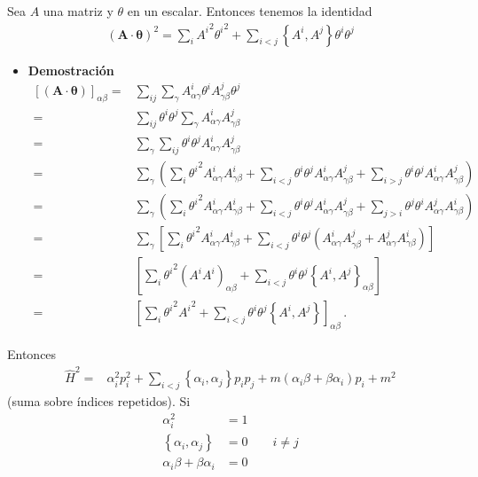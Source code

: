 Sea $A$ una matriz y $\theta$ en un escalar. Entonces tenemos la identidad
\begin{align}
  \label{eq:206qft}
  (\mathbf{A}\cdot\boldsymbol{\theta})^2=\sum_i {A^i}^2 {\theta^i}^2+\sum_{i\lt j}\left\{A^i,A^j  \right\}\theta^i \theta^j 
\end{align}
\begin{itemize}
\item \textbf{Demostración}
  \begin{align}
    \left[\left(\mathbf{A}\cdot\boldsymbol{\theta}\right)\right]_{\alpha\beta}
    =&\sum_{i j}\sum_\gamma A^i_{\alpha\gamma}\theta^iA^j_{\gamma\beta}\theta^j\nonumber\\    
    =&\sum_{i j}\theta^i\theta^j\sum_\gamma A^i_{\alpha\gamma}A^j_{\gamma\beta}\nonumber\\    
    =&\sum_\gamma \sum_{i j}\theta^i\theta^jA^i_{\alpha\gamma}A^j_{\gamma\beta}\nonumber\\    
    =&\sum_\gamma \left(\sum_{i}{\theta^i}^2A^i_{\alpha\gamma}A^i_{\gamma\beta}+\sum_{i<j}\theta^i\theta^jA^i_{\alpha\gamma}A^j_{\gamma\beta}+\sum_{i>j}\theta^i\theta^jA^i_{\alpha\gamma}A^j_{\gamma\beta}\right)\nonumber\\    
    =&\sum_\gamma \left(\sum_{i}{\theta^i}^2A^i_{\alpha\gamma}A^i_{\gamma\beta}+\sum_{i<j}\theta^i\theta^jA^i_{\alpha\gamma}A^j_{\gamma\beta}+\sum_{j>i}\theta^j\theta^iA^j_{\alpha\gamma}A^i_{\gamma\beta}\right)\nonumber\\    
    =&\sum_\gamma \left[\sum_{i}{\theta^i}^2A^i_{\alpha\gamma}A^i_{\gamma\beta}+\sum_{i<j}\theta^i\theta^j\left(A^i_{\alpha\gamma}A^j_{\gamma\beta}+A^j_{\alpha\gamma}A^i_{\gamma\beta}\right)\right]\nonumber\\    
    =&\left[\sum_{i}{\theta^i}^2\left(A^iA^i\right)_{\alpha\beta}+\sum_{i<j}\theta^i\theta^j\left\{ A^i,A^j\right\}_{\alpha\beta}\right]\nonumber\\    
    =&\left[\sum_{i}{\theta^i}^2{A^i}^2+\sum_{i<j}\theta^i\theta^j\left\{ A^i,A^j\right\}\right]_{\alpha\beta}\,.
  \end{align}

\end{itemize}
Entonces
\begin{align}
  \hat{H}^2=&\alpha_i^2p_i^2+\sum_{i\lt j}\left\{\alpha_i,\alpha_j\right\}p_i p_j+m(\alpha_i \beta+\beta\alpha_i)p_i+m^2
\end{align}
(suma sobre índices repetidos). Si
\begin{align}
  \label{eq:107qft}
  \alpha_i^2&=1\nonumber\\
  \left\{\alpha_i,\alpha_j\right\}&=0\qquad i\neq j\nonumber\\
  \alpha_i \beta+\beta\alpha_i&=0
\end{align}
